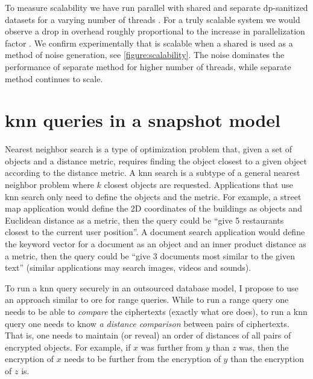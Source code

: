 				To measure scalability we have run parallel \epsolute{} with shared and separate \acrshort{dp}-sanitized datasets \serverDS{} for a varying number of threads \oramsNumber{}.
				For a truly scalable system we would observe a drop in overhead roughly proportional to the increase in parallelization factor \oramsNumber{}.
				We confirm experimentally that \epsolute{} is scalable when a shared \serverDS{} is used as a method of noise generation, see \cref{figure:scalability}.
				The noise dominates the performance of separate \serverDS{} method for higher number of threads, while separate \serverDS{} method continues to scale.

				

	\section{\acrshort{knn} queries in a snapshot model}

		Nearest neighbor search is a type of optimization problem that, given a set of objects and a distance metric, requires finding the object closest to a given object according to the distance metric.
		A \acrfull{knn} search is a subtype of a general nearest neighbor problem where $k$ closest objects are requested.
		Applications that use \acrshort{knn} search only need to define the objects and the metric.
		For example, a street map application would define the 2D coordinates of the buildings as objects and Euclidean distance as a metric, then the query could be ``give 5 restaurants closest to the current user position''.
		A document search application would define the keyword vector for a document as an object and an inner product distance as a metric, then the query could be ``give 3 documents most similar to the given text'' (similar applications may search images, videos and sounds).

		To run a \acrshort{knn} query securely in an outsourced database model, I propose to use an approach similar to \acrshort{ore} for range queries.
		While to run a range query one needs to be able to \emph{compare} the ciphertexts (exactly what \acrshort{ore} does), to run a \acrshort{knn} query one needs to know \emph{a distance comparison} between pairs of ciphertexts.
		That is, one needs to maintain (or reveal) an order of distances of all pairs of encrypted objects.
		For example, if $x$ was further from $y$ than $z$ was, then the encryption of $x$ needs to be further from the encryption of $y$ than the encryption of $z$ is.

